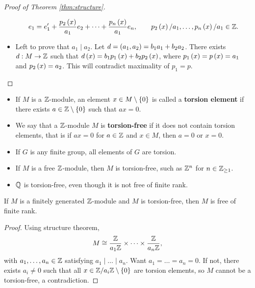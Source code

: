 \begin{proof}[Proof of Theorem \ref{thm:structure}]
\begin{itemize}
$$ e_1 = e_1' + \dfrac{p_2\left( x \right)}{a_1}e_2 + \dots + \dfrac{p_n\left( x \right)}{a_1}e_n, \qquad p_2\left( x \right) / a_1, \dots, p_n\left( x \right) / a_1 \in \mathbb{Z}. $$
\item Left to prove that $ a_1 \mid a_2 $. Let $ d = \left( a_1, a_2 \right) = b_1a_1 + b_2a_2 $. There exists $ d : M \to \mathbb{Z} $ such that $ d\left( x \right) = b_1p_1\left( x \right) + b_2p_2\left( x \right) $, where $ p_1\left( x \right) = p\left( x \right) = a_1 $ and $ p_2\left( x \right) = a_2 $. This will contradict maximality of $ p_1 = p $.
\end{itemize}
\end{proof}


\begin{definition}
\hfill
\begin{itemize}
\item If $ M $ is a $ \mathbb{Z} $-module, an element $ x \in M \setminus \left\{ 0 \right\} $ is called a \textbf{torsion element} if there exists $ a \in \mathbb{Z} \setminus \left\{ 0 \right\} $ such that $ ax = 0 $.
\item We say that a $ \mathbb{Z} $-module $ M $ is \textbf{torsion-free} if it does not contain torsion elements, that is if $ ax = 0 $ for $ a \in \mathbb{Z} $ and $ x \in M $, then $ a = 0 $ or $ x = 0 $.
\end{itemize}
\end{definition}

\begin{example*}
\hfill
\begin{itemize}
\item If $ G $ is any finite group, all elements of $ G $ are torsion.
\item If $ M $ is a free $ \mathbb{Z} $-module, then $ M $ is torsion-free, such as $ \mathbb{Z}^n $ for $ n \in \mathbb{Z}_{\ge 1} $.
\item $ \mathbb{Q} $ is torsion-free, even though it is not free of finite rank.
\end{itemize}
\end{example*}

\begin{proposition}
If $ M $ is a finitely generated $ \mathbb{Z} $-module and $ M $ is torsion-free, then $ M $ is free of finite rank.
\end{proposition}

\begin{proof}
Using structure theorem,
$$ M \cong \dfrac{\mathbb{Z}}{a_1\mathbb{Z}} \times \dots \times \dfrac{\mathbb{Z}}{a_n\mathbb{Z}}, $$
with $ a_1, \dots, a_n \in \mathbb{Z} $ satisfying $ a_1 \mid \dots \mid a_n $. Want $ a_1 = \dots = a_n = 0 $. If not, there exists $ a_i \ne 0 $ such that all $ x \in \mathbb{Z} / a_i\mathbb{Z} \setminus \left\{ 0 \right\} $ are torsion elements, so $ M $ cannot be a torsion-free, a contradiction.
\end{proof}

